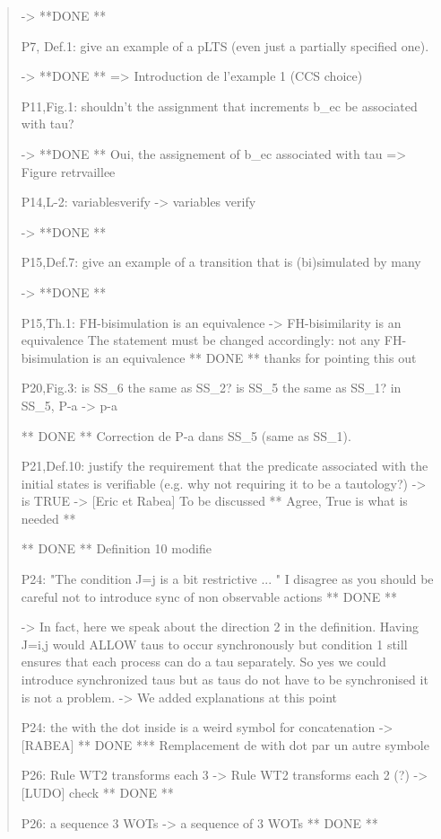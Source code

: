 \documentclass[10pt]{article}
\newenvironment{review}{\bgroup\itshape\begin{quote}}{\end{quote}\egroup}
\begin{document}
\begin{review}
-> **DONE **

P7, Def.1: give an example of a pLTS (even just a partially specified one).

-> **DONE ** => Introduction de l'example 1 (CCS choice)


P11,Fig.1: shouldn't the assignment that increments b_ec be associated with tau?

-> **DONE ** Oui, the assignement of b_ec associated with tau => Figure retrvaillee 

P14,L-2: variablesverify -> variables verify

-> **DONE **

P15,Def.7: give an example of a transition that is (bi)simulated by many

-> **DONE **

P15,Th.1: FH-bisimulation is an equivalence -> FH-bisimilarity is an equivalence
The statement must be changed accordingly: not any FH-bisimulation is an equivalence
** DONE ** thanks for pointing this out

P20,Fig.3: is SS_6 the same as SS_2? is SS_5 the same as SS_1? in SS_5, P-a -> p-a

** DONE ** Correction de P-a dans  SS_5 (same as SS_1).


P21,Def.10: justify the requirement that the predicate associated with the initial states is verifiable
(e.g. why not requiring it to be a tautology?)
-> is TRUE
-> [Eric et Rabea] To be discussed 
** Agree,  True is what is needed ** 

** DONE ** Definition 10 modifie

P24: "The condition J={j} is a bit restrictive ... " I disagree as you should be careful not to introduce sync of non observable actions
** DONE **

-> In fact, here we speak about the direction 2 in the definition. Having J={i,j} would ALLOW taus to occur synchronously but condition 1 still ensures that each process can do a tau separately. So yes we could introduce synchronized taus but as taus do not have to be synchronised it is not a problem.
-> We added explanations at this point

P24: the \cup with the dot inside is a weird symbol for concatenation
-> [RABEA]
** DONE *** Remplacement de \cup with dot par un autre symbole \oplus


P26: Rule WT2 transforms each 3 ->  Rule WT2 transforms each 2 (?)
-> [LUDO] check
** DONE **

P26: a sequence 3 WOTs -> a sequence of 3 WOTs
** DONE **


\end{review}
\end{document}
